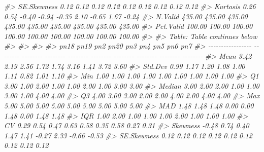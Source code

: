 \documentclass[
]{article}
\newenvironment{Shaded}{\begin{snugshade}}{\end{snugshade}}
\newcommand{\CommentTok}[1]{\textcolor[rgb]{0.56,0.35,0.01}{\textit{#1}}}
\begin{document}
\begin{Shaded}
\begin{Highlighting}[]
\CommentTok{\#\textgreater{}       SE.Skewness     0.12     0.12     0.12     0.12     0.12     0.12     0.12     0.12     0.12}
\CommentTok{\#\textgreater{}          Kurtosis     0.26     0.54    {-}0.40    {-}0.94    {-}0.35     2.10    {-}0.65     1.67    {-}0.24}
\CommentTok{\#\textgreater{}           N.Valid   435.00   435.00   435.00   435.00   435.00   435.00   435.00   435.00   435.00}
\CommentTok{\#\textgreater{}         Pct.Valid   100.00   100.00   100.00   100.00   100.00   100.00   100.00   100.00   100.00}
\CommentTok{\#\textgreater{} }
\CommentTok{\#\textgreater{} Table: Table continues below}
\CommentTok{\#\textgreater{} }
\CommentTok{\#\textgreater{}  }
\CommentTok{\#\textgreater{} }
\CommentTok{\#\textgreater{}                       pn18     pn19      pn2     pn20      pn3      pn4      pn5      pn6      pn7}
\CommentTok{\#\textgreater{} {-}{-}{-}{-}{-}{-}{-}{-}{-}{-}{-}{-}{-}{-}{-}{-}{-} {-}{-}{-}{-}{-}{-}{-}{-} {-}{-}{-}{-}{-}{-}{-}{-} {-}{-}{-}{-}{-}{-}{-}{-} {-}{-}{-}{-}{-}{-}{-}{-} {-}{-}{-}{-}{-}{-}{-}{-} {-}{-}{-}{-}{-}{-}{-}{-} {-}{-}{-}{-}{-}{-}{-}{-} {-}{-}{-}{-}{-}{-}{-}{-} {-}{-}{-}{-}{-}{-}{-}{-}}
\CommentTok{\#\textgreater{}              Mean     3.42     2.19     2.56     1.72     1.74     3.16     1.41     3.72     3.60}
\CommentTok{\#\textgreater{}           Std.Dev     0.99     1.17     1.20     1.08     1.00     1.11     0.82     1.01     1.10}
\CommentTok{\#\textgreater{}               Min     1.00     1.00     1.00     1.00     1.00     1.00     1.00     1.00     1.00}
\CommentTok{\#\textgreater{}                Q1     3.00     1.00     2.00     1.00     1.00     2.00     1.00     3.00     3.00}
\CommentTok{\#\textgreater{}            Median     3.00     2.00     2.00     1.00     1.00     3.00     1.00     4.00     4.00}
\CommentTok{\#\textgreater{}                Q3     4.00     3.00     3.00     2.00     2.00     4.00     2.00     4.00     4.00}
\CommentTok{\#\textgreater{}               Max     5.00     5.00     5.00     5.00     5.00     5.00     5.00     5.00     5.00}
\CommentTok{\#\textgreater{}               MAD     1.48     1.48     1.48     0.00     0.00     1.48     0.00     1.48     1.48}
\CommentTok{\#\textgreater{}               IQR     1.00     2.00     1.00     1.00     1.00     2.00     1.00     1.00     1.00}
\CommentTok{\#\textgreater{}                CV     0.29     0.54     0.47     0.63     0.58     0.35     0.58     0.27     0.31}
\CommentTok{\#\textgreater{}          Skewness    {-}0.48     0.74     0.40     1.47     1.41    {-}0.27     2.33    {-}0.66    {-}0.53}
\CommentTok{\#\textgreater{}       SE.Skewness     0.12     0.12     0.12     0.12     0.12     0.12     0.12     0.12     0.12}

\end{Highlighting}
\end{Shaded}
\end{document}
